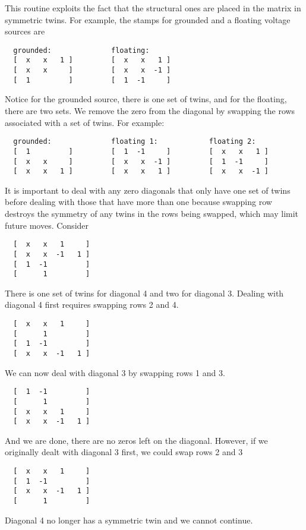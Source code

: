 This routine exploits the fact that the structural ones are placed in the matrix in symmetric twins. For example, the stamps for grounded and a floating voltage sources are 

\footnotesize\begin{verbatim}  grounded:              floating:
  [  x   x   1 ]         [  x   x   1 ]
  [  x   x     ]         [  x   x  -1 ]
  [  1         ]         [  1  -1     ]
\end{verbatim}\normalsize 
 Notice for the grounded source, there is one set of twins, and for the floating, there are two sets. We remove the zero from the diagonal by swapping the rows associated with a set of twins. For example: 

\footnotesize\begin{verbatim}  grounded:              floating 1:            floating 2:
  [  1         ]         [  1  -1     ]         [  x   x   1 ]
  [  x   x     ]         [  x   x  -1 ]         [  1  -1     ]
  [  x   x   1 ]         [  x   x   1 ]         [  x   x  -1 ]
\end{verbatim}\normalsize 


It is important to deal with any zero diagonals that only have one set of twins before dealing with those that have more than one because swapping row destroys the symmetry of any twins in the rows being swapped, which may limit future moves. Consider 

\footnotesize\begin{verbatim}  [  x   x   1     ]
  [  x   x  -1   1 ]
  [  1  -1         ]
  [      1         ]
\end{verbatim}\normalsize 
 There is one set of twins for diagonal 4 and two for diagonal 3. Dealing with diagonal 4 first requires swapping rows 2 and 4. 

\footnotesize\begin{verbatim}  [  x   x   1     ]
  [      1         ]
  [  1  -1         ]
  [  x   x  -1   1 ]
\end{verbatim}\normalsize 
 We can now deal with diagonal 3 by swapping rows 1 and 3. 

\footnotesize\begin{verbatim}  [  1  -1         ]
  [      1         ]
  [  x   x   1     ]
  [  x   x  -1   1 ]
\end{verbatim}\normalsize 
 And we are done, there are no zeros left on the diagonal. However, if we originally dealt with diagonal 3 first, we could swap rows 2 and 3 

\footnotesize\begin{verbatim}  [  x   x   1     ]
  [  1  -1         ]
  [  x   x  -1   1 ]
  [      1         ]
\end{verbatim}\normalsize 
 Diagonal 4 no longer has a symmetric twin and we cannot continue.

